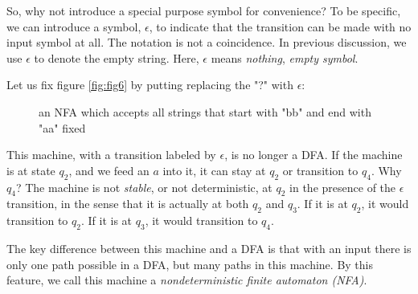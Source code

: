\documentclass[11pt]{article}
\begin{document}
So, why not introduce a special purpose symbol for convenience? To be
specific, we can introduce a symbol, $\epsilon$, to indicate that the
transition can be made with no input symbol at all. The notation is
not a coincidence. In previous discussion, we use $\epsilon$ to denote
the empty string. Here, $\epsilon$ means \emph{nothing},
\emph{empty symbol}.

Let us fix figure \ref{fig:fig6} by putting replacing the "?" with
$\epsilon$:

\begin{figure}[ht]
    \centering
    \caption{an NFA which accepts all strings that start with "bb" and end with "aa" fixed}
    \label{fig:fig7}
\end{figure}

This machine, with a transition labeled by $\epsilon$, is no longer
a DFA. If the machine is at state $q_2$, and we feed an $a$ into it,
it can stay at $q_2$ or transition to $q_4$. Why $q_4$? The machine
is not \emph{stable}, or not deterministic, at $q_2$ in the presence
of the $\epsilon$ transition, in the sense that it is actually at
both $q_2$ and $q_3$. If it is at $q_2$, it would transition to
$q_2$. If it is at $q_3$, it would transition to $q_4$.

The key difference between this machine and a DFA is that with an
input there is only one path possible in a DFA, but many paths in
this machine. By this feature, we call this machine a
\emph{nondeterministic finite automaton (NFA)}.
\end{document}

